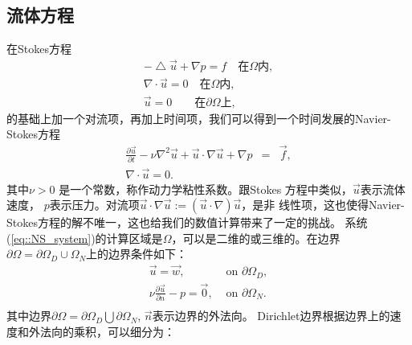     \subsection{流体方程}
        在Stokes方程
        \begin{equation}
            \begin{aligned}
                -\bigtriangleup \vec{u} + \nabla p = f \quad \text{在}\Omega \text{内}, \\
                \nabla \cdot \vec{u} = 0 \quad \text{在}\Omega \text{内},\\
                \vec{u} = 0 \qquad \text{在}\partial \Omega \text{上},
            \end{aligned}
            \label{eq::stokes}
        \end{equation}
        的基础上加一个对流项，再加上时间项，我们可以得到一个时间发展的Navier-Stokes方程
        \begin{equation}
            \begin{aligned}
                \frac{\partial \vec{u}}{\partial t}-\nu \nabla^2\vec{u} + \vec{u}\cdot \nabla \vec{u} + \nabla p &=& \vec{f}, \\
                \nabla \cdot \vec{u} = 0.
            \end{aligned}
            \label{eq::NS_system}
        \end{equation}
        其中$\nu > 0$ 是一个常数，称作动力学粘性系数。跟Stokes 方程中类似，$\vec{u}$表示流体速度，
        $p$表示压力。对流项$\vec{u} \cdot \nabla \vec{u} := (\vec{u} \cdot \nabla) \vec{u}$，是非
        线性项，这也使得Navier-Stokes方程的解不唯一，这也给我们的数值计算带来了一定的挑战。
        系统(\ref{eq::NS_system})的计算区域是$\Omega$，可以是二维的或三维的。在边界$\partial \Omega =
        \partial \Omega_D \cup \Omega_N$上的边界条件如下：
        \begin{equation}
            \begin{array}{ll}
                \vec{u} = \vec{w},& \mbox{ on } \partial \Omega_D,\\
                \nu \displaystyle \frac{\partial \vec{u}}{\partial n} - p =
                \vec{0}, & \mbox{ on } \partial \Omega_N.  \\
             \end{array}
            \label{eq::bc}
        \end{equation}
        其中边界$\partial \Omega = \partial \Omega_D \bigcup \partial \Omega_N$,
        $\vec{n}$表示边界的外法向。
        Dirichlet边界根据边界上的速度和外法向的乘积，可以细分为：
